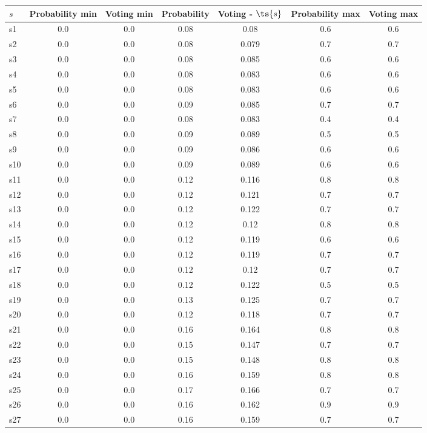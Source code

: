 \documentclass{article}
\begin{document}
\noindent\begin{tabular}{|l|c|c|c|c|c|c|}
\hline
$s$& Probability min & Voting min & Probability & Voting - $\ts{s}$ & Probability max & Voting max\\
\hline
s1 &0.0 & 0.0 & 0.08 & 0.08 & 0.6 & 0.6\\
\hline
s2 &0.0 & 0.0 & 0.08 & 0.079 & 0.7 & 0.7\\
\hline
s3 &0.0 & 0.0 & 0.08 & 0.085 & 0.6 & 0.6\\
\hline
s4 &0.0 & 0.0 & 0.08 & 0.083 & 0.6 & 0.6\\
\hline
s5 &0.0 & 0.0 & 0.08 & 0.083 & 0.6 & 0.6\\
\hline
s6 &0.0 & 0.0 & 0.09 & 0.085 & 0.7 & 0.7\\
\hline
s7 &0.0 & 0.0 & 0.08 & 0.083 & 0.4 & 0.4\\
\hline
s8 &0.0 & 0.0 & 0.09 & 0.089 & 0.5 & 0.5\\
\hline
s9 &0.0 & 0.0 & 0.09 & 0.086 & 0.6 & 0.6\\
\hline
s10 &0.0 & 0.0 & 0.09 & 0.089 & 0.6 & 0.6\\
\hline
s11 &0.0 & 0.0 & 0.12 & 0.116 & 0.8 & 0.8\\
\hline
s12 &0.0 & 0.0 & 0.12 & 0.121 & 0.7 & 0.7\\
\hline
s13 &0.0 & 0.0 & 0.12 & 0.122 & 0.7 & 0.7\\
\hline
s14 &0.0 & 0.0 & 0.12 & 0.12 & 0.8 & 0.8\\
\hline
s15 &0.0 & 0.0 & 0.12 & 0.119 & 0.6 & 0.6\\
\hline
s16 &0.0 & 0.0 & 0.12 & 0.119 & 0.7 & 0.7\\
\hline
s17 &0.0 & 0.0 & 0.12 & 0.12 & 0.7 & 0.7\\
\hline
s18 &0.0 & 0.0 & 0.12 & 0.122 & 0.5 & 0.5\\
\hline
s19 &0.0 & 0.0 & 0.13 & 0.125 & 0.7 & 0.7\\
\hline
s20 &0.0 & 0.0 & 0.12 & 0.118 & 0.7 & 0.7\\
\hline
s21 &0.0 & 0.0 & 0.16 & 0.164 & 0.8 & 0.8\\
\hline
s22 &0.0 & 0.0 & 0.15 & 0.147 & 0.7 & 0.7\\
\hline
s23 &0.0 & 0.0 & 0.15 & 0.148 & 0.8 & 0.8\\
\hline
s24 &0.0 & 0.0 & 0.16 & 0.159 & 0.8 & 0.8\\
\hline
s25 &0.0 & 0.0 & 0.17 & 0.166 & 0.7 & 0.7\\
\hline
s26 &0.0 & 0.0 & 0.16 & 0.162 & 0.9 & 0.9\\
\hline
s27 &0.0 & 0.0 & 0.16 & 0.159 & 0.7 & 0.7\\

\end{tabular}
\end{document}
